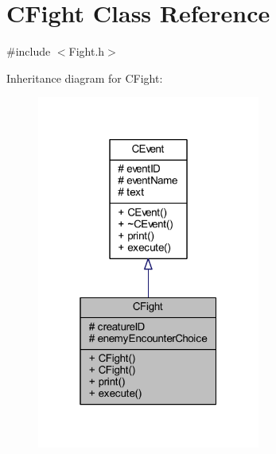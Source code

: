 \hypertarget{class_c_fight}{}\section{C\+Fight Class Reference}
\label{class_c_fight}


{\ttfamily \#include $<$Fight.\+h$>$}



Inheritance diagram for C\+Fight\+:\nopagebreak
\begin{figure}[H]
\begin{center}
\leavevmode
\includegraphics[width=208pt]{class_c_fight__inherit__graph}
\end{center}
\end{figure}


